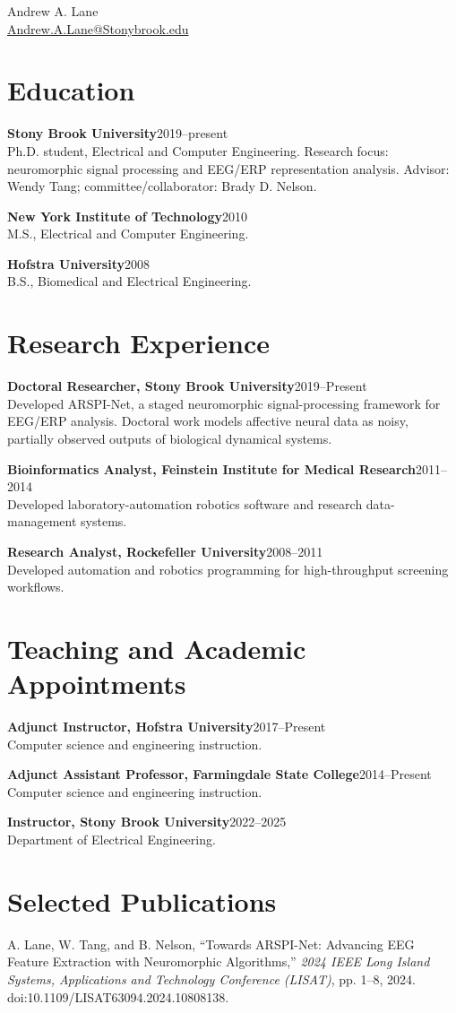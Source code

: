 \documentclass[10pt]{article}
\newcommand{\entry}[2]{\textbf{#1}\hfill #2\\}
\newcommand{\pub}[1]{\noindent\hangindent=0.35cm #1\par\vspace{2pt}}
\begin{document}
\begin{center}
{\Large Andrew A. Lane}\\[-1pt]
{\small \href{mailto:Andrew.A.Lane@Stonybrook.edu}{Andrew.A.Lane@Stonybrook.edu}}
\end{center}

\section*{Education}
\entry{Stony Brook University}{2019--present}
Ph.D. student, Electrical and Computer Engineering. Research focus: neuromorphic signal processing and EEG/ERP representation analysis. Advisor: Wendy Tang; committee/collaborator: Brady D. Nelson.

\entry{New York Institute of Technology}{2010}
M.S., Electrical and Computer Engineering.

\entry{Hofstra University}{2008}
B.S., Biomedical and Electrical Engineering.


\section*{Research Experience}
\entry{Doctoral Researcher, Stony Brook University}{2019--Present}
Developed ARSPI-Net, a staged neuromorphic signal-processing framework for EEG/ERP analysis. Doctoral work models affective neural data as noisy, partially observed outputs of biological dynamical systems.

\entry{Bioinformatics Analyst, Feinstein Institute for Medical Research}{2011--2014}
Developed laboratory-automation robotics software and research data-management systems.

\entry{Research Analyst, Rockefeller University}{2008--2011}
Developed automation and robotics programming for high-throughput screening workflows.

\section*{Teaching and Academic Appointments}
\entry{Adjunct Instructor, Hofstra University}{2017--Present}
Computer science and engineering instruction.

\entry{Adjunct Assistant Professor, Farmingdale State College}{2014--Present}
Computer science and engineering instruction.

\entry{Instructor, Stony Brook University}{2022--2025}
Department of Electrical Engineering.

\section*{Selected Publications}
\pub{A. Lane, W. Tang, and B. Nelson, ``Towards ARSPI-Net: Advancing EEG Feature Extraction with Neuromorphic Algorithms,'' \textit{2024 IEEE Long Island Systems, Applications and Technology Conference (LISAT)}, pp. 1--8, 2024. doi:10.1109/LISAT63094.2024.10808138.}
\end{document}
